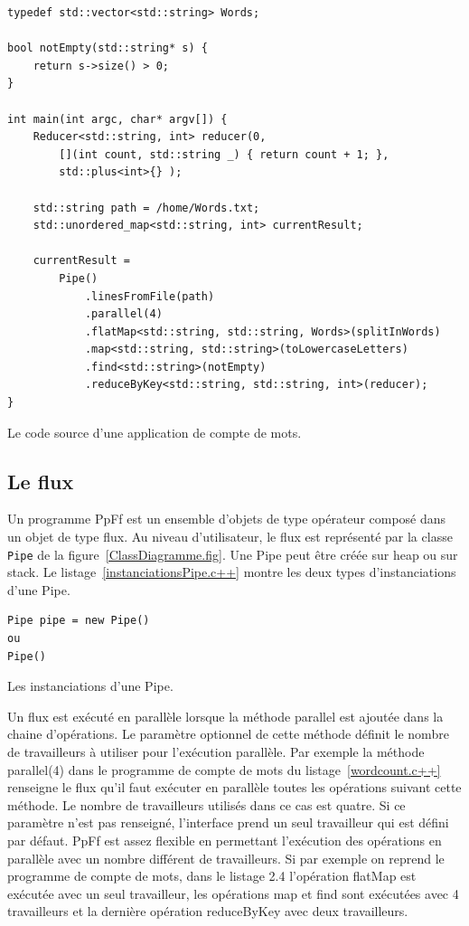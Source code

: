 \begin{Listing}[tbp]
\begin{lstlisting}
typedef std::vector<std::string> Words;

bool notEmpty(std::string* s) {
    return s->size() > 0;
}

int main(int argc, char* argv[]) {
    Reducer<std::string, int> reducer(0, 
    	[](int count, std::string _) { return count + 1; },
        std::plus<int>{} );

   	std::string path = /home/Words.txt; 
	std::unordered_map<std::string, int> currentResult;

	currentResult = 
		Pipe()
			.linesFromFile(path) 
			.parallel(4)
			.flatMap<std::string, std::string, Words>(splitInWords)
			.map<std::string, std::string>(toLowercaseLetters)
			.find<std::string>(notEmpty)
			.reduceByKey<std::string, std::string, int>(reducer);
}
\end{lstlisting}
\caption{Le code source d'une application de compte de mots.}
\label{wordcount.c++}
\end{Listing}


\subsection{Le flux}

Un programme PpFf est un ensemble d'objets de type op\'erateur compos\'e dans un objet de type flux. Au niveau d'utilisateur, le flux est repr\'esent\'e par la classe \texttt{Pipe} de la figure~\ref{ClassDiagramme.fig}. Une Pipe peut \^etre cr\'e\'ee sur heap ou sur stack. Le listage~\ref{instanciationsPipe.c++} montre les deux types d'instanciations d'une Pipe.

\begin{Listing}[tbp]
\begin{lstlisting}
Pipe pipe = new Pipe()
ou
Pipe()
\end{lstlisting}
\caption{Les instanciations d'une Pipe.}
\label{instanciationsPipe.c++}
\end{Listing}

Un flux est ex\'ecut\'e en parall\`ele lorsque la m\'ethode parallel est ajout\'ee dans la chaine d'op\'erations. Le param\`etre optionnel de cette m\'ethode d\'efinit le nombre de travailleurs \`a utiliser pour l'ex\'ecution parall\`ele. Par exemple la m\'ethode parallel(4) dans le programme de compte de mots du listage~\ref{wordcount.c++} renseigne le flux qu'il faut ex\'ecuter en parall\`ele toutes les op\'erations suivant cette m\'ethode. Le nombre de travailleurs utilis\'es dans ce cas est quatre. Si ce param\`etre n'est pas renseign\'e, l'interface prend un seul travailleur qui est d\'efini par d\'efaut. PpFf est assez flexible en permettant l'ex\'ecution des op\'erations en parall\`ele avec un nombre diff\'erent de travailleurs. Si par exemple on reprend le programme de compte de mots, dans le listage 2.4 l’opération flatMap est exécutée avec un seul travailleur, les opérations map et find sont exécutées avec 4 travailleurs et la dernière opération reduceByKey avec deux travailleurs. 

